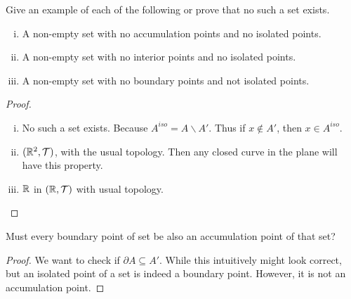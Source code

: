 \begin{problem}
	Give an example of each of the following or prove that no such a set exists.
	\begin{enumerate}[(i)]
		\item A non-empty set with no accumulation points and no isolated points.
		\item A non-empty set with no interior points and no isolated points.
		\item A non-empty set with no boundary points and not isolated points.
	\end{enumerate}
\end{problem}
\begin{proof}
	~\vspace{2pt}
	\begin{enumerate}[(i)]
		\item No such a set exists. Because $A^{iso} = A \backslash A'$. Thus if $x\notin A'$, then $x \in A^{iso}$.
		\item $(\mathbb{R}^2,\mathcal{T})$, with the usual topology. Then any closed curve in the plane will have this property.
		\item $\mathbb{R}$ in $(\mathbb{R},\mathcal{T})$ with usual topology.
	\end{enumerate}
\end{proof}


\begin{problem}
	Must every boundary point of set be also an accumulation point of that set?
\end{problem}
\begin{proof}
	We want to check if $\partial A \subseteq A'$. While this intuitively might look correct, but an isolated point of a set is indeed a boundary point. However, it is not an accumulation point. 
\end{proof}

